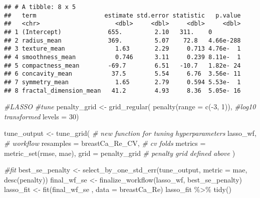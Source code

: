 \documentclass[
]{article}
\newenvironment{Shaded}{\begin{snugshade}}{\end{snugshade}}
\newcommand{\AttributeTok}[1]{\textcolor[rgb]{0.77,0.63,0.00}{#1}}
\newcommand{\CommentTok}[1]{\textcolor[rgb]{0.56,0.35,0.01}{\textit{#1}}}
\newcommand{\DecValTok}[1]{\textcolor[rgb]{0.00,0.00,0.81}{#1}}
\newcommand{\FunctionTok}[1]{\textcolor[rgb]{0.00,0.00,0.00}{#1}}
\newcommand{\NormalTok}[1]{#1}
\newcommand{\OtherTok}[1]{\textcolor[rgb]{0.56,0.35,0.01}{#1}}
\newcommand{\SpecialCharTok}[1]{\textcolor[rgb]{0.00,0.00,0.00}{#1}}
\newcommand{\StringTok}[1]{\textcolor[rgb]{0.31,0.60,0.02}{#1}}
\begin{document}
\begin{verbatim}
## # A tibble: 8 x 5
##   term                   estimate std.error statistic   p.value
##   <chr>                     <dbl>     <dbl>     <dbl>     <dbl>
## 1 (Intercept)             655.         2.10   311.    0        
## 2 radius_mean             369.         5.07    72.8   4.66e-288
## 3 texture_mean              1.63       2.29     0.713 4.76e-  1
## 4 smoothness_mean           0.746      3.11     0.239 8.11e-  1
## 5 compactness_mean        -69.7        6.51   -10.7   1.82e- 24
## 6 concavity_mean           37.5        5.54     6.76  3.56e- 11
## 7 symmetry_mean             1.65       2.79     0.594 5.53e-  1
## 8 fractal_dimension_mean   41.2        4.93     8.36  5.05e- 16
\end{verbatim}

\begin{Shaded}
\begin{Highlighting}[]
\CommentTok{\#LASSO}
\CommentTok{\#tune}
\NormalTok{penalty\_grid }\OtherTok{\textless{}{-}} \FunctionTok{grid\_regular}\NormalTok{(}
  \FunctionTok{penalty}\NormalTok{(}\AttributeTok{range =} \FunctionTok{c}\NormalTok{(}\SpecialCharTok{{-}}\DecValTok{3}\NormalTok{, }\DecValTok{1}\NormalTok{)), }\CommentTok{\#log10 transformed }
  \AttributeTok{levels =} \DecValTok{30}\NormalTok{)}

\NormalTok{tune\_output }\OtherTok{\textless{}{-}} \FunctionTok{tune\_grid}\NormalTok{( }\CommentTok{\# new function for tuning hyperparameters}
\NormalTok{  lasso\_wf, }\CommentTok{\# workflow}
  \AttributeTok{resamples =}\NormalTok{ breastCa\_Re\_CV, }\CommentTok{\# cv folds}
  \AttributeTok{metrics =} \FunctionTok{metric\_set}\NormalTok{(rmse, mae),}
  \AttributeTok{grid =}\NormalTok{ penalty\_grid }\CommentTok{\# penalty grid defined above}
\NormalTok{)}

\CommentTok{\#fit}
\NormalTok{best\_se\_penalty }\OtherTok{\textless{}{-}} \FunctionTok{select\_by\_one\_std\_err}\NormalTok{(tune\_output, }\AttributeTok{metric =} \StringTok{\textquotesingle{}mae\textquotesingle{}}\NormalTok{, }\FunctionTok{desc}\NormalTok{(penalty))}
\NormalTok{final\_wf\_se }\OtherTok{\textless{}{-}} \FunctionTok{finalize\_workflow}\NormalTok{(lasso\_wf, best\_se\_penalty)}
\NormalTok{lasso\_fit }\OtherTok{\textless{}{-}} \FunctionTok{fit}\NormalTok{(final\_wf\_se , }\AttributeTok{data =}\NormalTok{ breastCa\_Re)}
\NormalTok{lasso\_fit }\SpecialCharTok{\%\textgreater{}\%} \FunctionTok{tidy}\NormalTok{()}
\end{Highlighting}
\end{Shaded}
\end{document}
